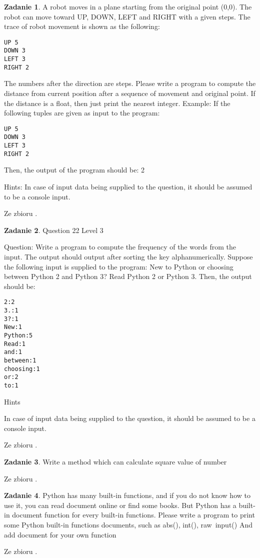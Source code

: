 \documentclass[11pt]{article}
\theoremstyle{definition}
\newtheorem{zadanie}{Zadanie}
\newcommand{\fromA}{\small Ze zbioru \cite{python100}.}
\begin{document}
\begin{zadanie}
A robot moves in a plane starting from the original point (0,0). The robot can move toward UP, DOWN, LEFT and RIGHT with a given steps. The trace of robot movement is shown as the following:
\begin{verbatim}
UP 5
DOWN 3
LEFT 3
RIGHT 2
\end{verbatim}
The numbers after the direction are steps. Please write a program to compute the distance from current position after a sequence of movement and original point. If the distance is a float, then just print the nearest integer.
Example:
If the following tuples are given as input to the program:
\begin{verbatim}
UP 5
DOWN 3
LEFT 3
RIGHT 2
\end{verbatim}
Then, the output of the program should be:
2

Hints:
In case of input data being supplied to the question, it should be assumed to be a console input.


\fromA
\end{zadanie}
\begin{zadanie}
Question 22
Level 3

Question:
Write a program to compute the frequency of the words from the input. The output should output after sorting the key alphanumerically. 
Suppose the following input is supplied to the program:
New to Python or choosing between Python 2 and Python 3? Read Python 2 or Python 3.
Then, the output should be:
\begin{verbatim}
2:2
3.:1
3?:1
New:1
Python:5
Read:1
and:1
between:1
choosing:1
or:2
to:1
\end{verbatim}

Hints

In case of input data being supplied to the question, it should be assumed to be a console input.

\fromA
\end{zadanie}
\begin{zadanie}
Write a method which can calculate square value of number

\fromA
\end{zadanie}
\begin{zadanie}
Python has many built-in functions, and if you do not know how to use it, you can read document online or find some books. But Python has a built-in document function for every built-in functions.
    Please write a program to print some Python built-in functions documents, such as abs(), int(), raw\
    input()
    And add document for your own function

\fromA
\end{zadanie}
\end{document}
